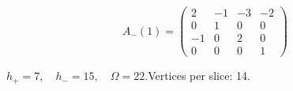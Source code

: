 \begin{minipage}{\linewidth}
\begin{minipage}[c]{0.495\linewidth}
\end{minipage}%
\begin{minipage}[c]{0.495\linewidth}\centering\fontsize{9.7}{12}\selectfont
\setlength{\abovedisplayskip}{4pt}\setlength{\belowdisplayskip}{4pt}
\setlength{\abovedisplayshortskip}{4pt}\setlength{\belowdisplayshortskip}{4pt}
\setlength{\arraycolsep}{3pt}\renewcommand{\arraystretch}{1.08}
\[A_{-}(1)=\begin{pmatrix}2 & -1 & -3 & -2\\0 & 1 & 0 & 0\\-1 & 0 & 2 & 0\\0 & 0 & 0 & 1\end{pmatrix}\]
\end{minipage}%
\par\smallskip\noindent\small $h_+=7,\quad h_-=15,\quad \Omega=22.$\quad Vertices per slice: 14.
\end{minipage}\par\vfill
